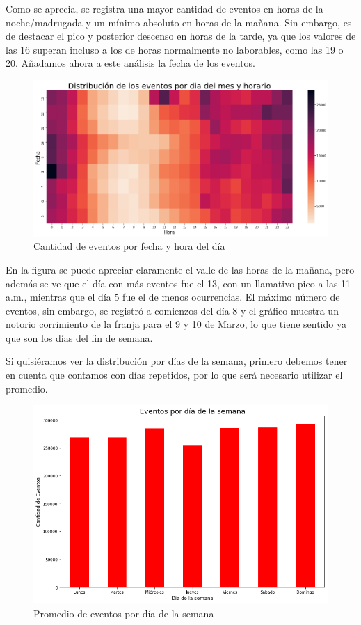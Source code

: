 \documentclass[a4paper, 12pt]{article}
\begin{document}
		Como se aprecia, se registra una mayor cantidad de eventos en horas de la noche/madrugada y un mínimo absoluto en horas de la mañana. Sin embargo, es de destacar el pico y posterior descenso en horas de la tarde, ya que los valores de las 16 superan incluso a los de horas normalmente no laborables, como las 19 o 20.
		Añadamos ahora a este análisis la fecha de los eventos.
		
		\FloatBarrier
		\begin{figure}[h]
			\centering
			\includegraphics[width=\textwidth]{images/events/eventsxdiayhora.png}
			\caption{Cantidad de eventos por fecha y hora del día}
		\end{figure}
		\FloatBarrier
		
		En la figura se puede apreciar claramente el valle de las horas de la mañana, pero además se ve que el día con más eventos fue el 13, con un llamativo pico a las 11 a.m., mientras que el día 5 fue el de menos ocurrencias. El máximo número de eventos, sin embargo, se registró a comienzos del día 8 y el gráfico muestra un notorio corrimiento de la franja para el 9 y 10 de Marzo, lo que tiene sentido ya que son los días del fin de semana.
		
		Si quisiéramos ver la distribución por días de la semana, primero debemos tener en cuenta que contamos con días repetidos, por lo que será necesario utilizar el promedio.
		
		\FloatBarrier
		\begin{figure}[h]
			\centering
			\includegraphics[width=\textwidth]{images/events/eventsxdia.png}
			\caption{Promedio de eventos por día de la semana}
		\end{figure}
		\FloatBarrier
		
\end{document}
